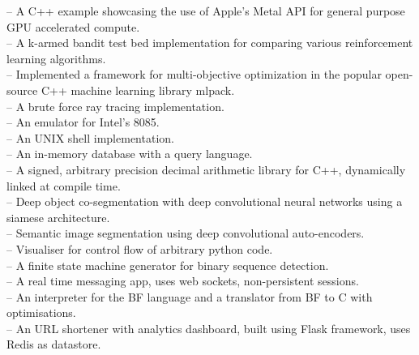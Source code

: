 \documentclass[mm]{simple_style}
\begin{document}
\begin{resume}
\href{https://github.com/say4n/metal.compute}{} -- A C++ example showcasing the use of Apple's Metal API for general purpose GPU accelerated compute.\\
\href{https://github.com/say4n/bandit.rl}{} -- A k-armed bandit test bed implementation for comparing various reinforcement learning algorithms.\\
\href{https://github.com/mlpack/ensmallen}{} -- Implemented a framework for multi-objective optimization in the popular open-source C++ machine learning library mlpack.\\
\href{https://github.com/say4n/rtx.go}{} -- A brute force ray tracing implementation.\\
\href{https://github.com/say4n/eightyfive}{} -- An emulator for Intel’s 8085.\\
\href{https://github.com/say4n/ysh}{} -- An UNIX shell implementation.\\
\href{https://github.com/say4n/gobi}{} -- An in-memory database with a query language.\\
\href{https://github.com/say4n/infinity}{} -- A signed, arbitrary precision decimal arithmetic library for C++, dynamically linked at compile time.\\
\href{https://github.com/say4n/deepcosegmentation.pytorch}{} – Deep object co-segmentation with deep convolutional neural networks using a siamese architecture.\\
\href{https://github.com/say4n/pytorch-segnet}{} -- Semantic image segmentation using deep convolutional auto-encoders.\\
\href{https://github.com/say4n/flow}{} -- Visualiser for control flow of arbitrary python code.\\
\href{https://github.com/say4n/fsmutil}{} -- A finite state machine generator for binary sequence detection.\\
\href{https://github.com/say4n/pyscuss}{} – A real time messaging app, uses web sockets, non-persistent sessions.\\
\href{https://github.com/say4n/bfutil}{} -- An interpreter for the BF language and a translator from BF to C with optimisations.\\
\href{https://github.com/say4n/LinkTo}{} -- An URL shortener with analytics dashboard, built using Flask framework, uses Redis as datastore.


\end{resume}
\end{document}
